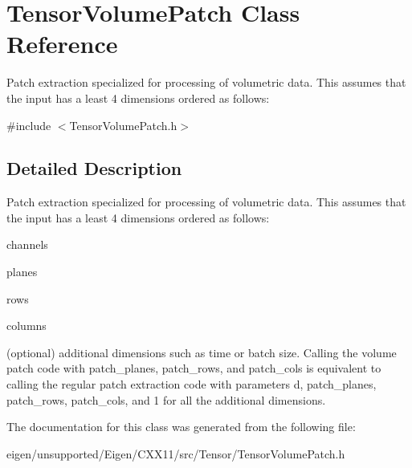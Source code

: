 \hypertarget{class_tensor_volume_patch}{}\section{Tensor\+Volume\+Patch Class Reference}
\label{class_tensor_volume_patch}


Patch extraction specialized for processing of volumetric data. This assumes that the input has a least 4 dimensions ordered as follows\+:  




{\ttfamily \#include $<$Tensor\+Volume\+Patch.\+h$>$}



\subsection{Detailed Description}
Patch extraction specialized for processing of volumetric data. This assumes that the input has a least 4 dimensions ordered as follows\+: 


\begin{DoxyItemize}
\item channels
\item planes
\item rows
\item columns
\item (optional) additional dimensions such as time or batch size. Calling the volume patch code with patch\+\_\+planes, patch\+\_\+rows, and patch\+\_\+cols is equivalent to calling the regular patch extraction code with parameters d, patch\+\_\+planes, patch\+\_\+rows, patch\+\_\+cols, and 1 for all the additional dimensions. 
\end{DoxyItemize}

The documentation for this class was generated from the following file\+:\begin{DoxyCompactItemize}
\item 
eigen/unsupported/\+Eigen/\+C\+X\+X11/src/\+Tensor/\+Tensor\+Volume\+Patch.\+h\end{DoxyCompactItemize}
